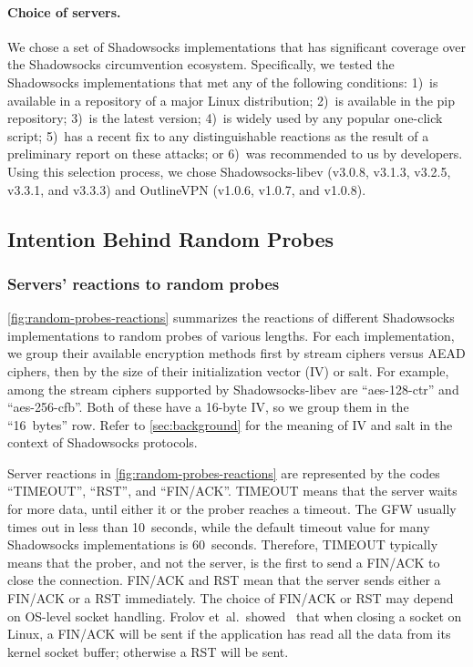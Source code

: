 \documentclass[sigconf,letterpaper]{acmart}
\begin{document}
\paragraph{Choice of servers.}
We chose a set of Shadowsocks implementations that has significant coverage over the Shadowsocks circumvention ecosystem.
Specifically,
we tested the Shadowsocks implementations that met any of the following conditions:
1)~is available in a repository of a major Linux distribution;
2)~is available in the pip repository;
3)~is the latest version;
4)~is widely used by any popular one-click script;
5)~has a recent fix to any distinguishable reactions as the result of a preliminary report on these attacks; or
6)~was recommended to us by developers.
Using this selection process,
we chose Shadowsocks-libev (v3.0.8, v3.1.3, v3.2.5, v3.3.1, and v3.3.3) and OutlineVPN (v1.0.6, v1.0.7, and v1.0.8).

\subsection{Intention Behind Random Probes}
\label{sec:probe-types-random}

\subsubsection{Servers' reactions to random probes}

\autoref{fig:random-probes-reactions} summarizes the reactions of different Shadowsocks implementations
to random probes of various lengths.
For each implementation,
we group their available encryption methods
first by stream ciphers versus AEAD ciphers,
then by the size of their initialization vector (IV) or salt.
For example, among the stream ciphers supported by Shadowsocks-libev are
``aes-128-ctr'' and ``aes-256-cfb''.
Both of these have a 16-byte IV,
so we group them in the ``16~bytes'' row.
Refer to \autoref{sec:background} for the meaning of IV and salt in the context of Shadowsocks protocols.

Server reactions in \autoref{fig:random-probes-reactions} are represented by the codes ``TIMEOUT'', ``RST'', and ``FIN/ACK''.
TIMEOUT means that the server waits for more data, until either it or the prober reaches a timeout.
The GFW usually times out in less than 10~seconds,
while the default timeout value for many Shadowsocks implementations is 60~seconds.
Therefore, TIMEOUT typically means that the prober, and not the server,
is the first to send a FIN/ACK to close the connection.
FIN/ACK and RST mean that the server sends either a FIN/ACK or a RST immediately.
The choice of FIN/ACK or RST may depend on OS-level socket handling.
Frolov et~al.\ showed~\cite[\S IV.C]{Frolov2020a}
that when closing a socket on Linux,
a FIN/ACK will be sent if the application has read all the data from its kernel socket buffer;
otherwise a RST will be sent.
\end{document}

